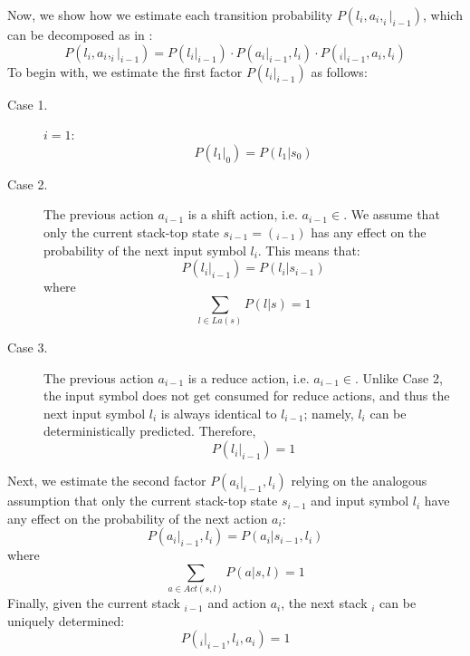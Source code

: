 \documentclass[a4j]{article}
\def\st{}
\def\top{}
\def\As{}
\def\Ar{}
\def\eq#1{}
\begin{document}
Now, we show how we estimate each transition probability
$P(l_i,a_i,\st_i|\st_{i-1})$, which can be decomposed as in \eq{St0}:
\begin{equation}
  \label{eq:St0}
  P(l_i,a_i,\st_i|\st_{i-1}) = P(l_i|\st_{i-1})\cdot
    P(a_i|\st_{i-1},l_{i})\cdot
    P(\st_i|\st_{i-1},a_{i},l_{i})
\end{equation}
To begin with, we estimate the first factor $P(l_i|\st_{i-1})$ as follows:
\begin{description}
\item[Case 1.] $i=1$:
  \begin{equation}
    \label{eq:l0}
    P(l_1|\st_0)=P(l_1|s_0)
  \end{equation}
\item[Case 2.] The previous action $a_{i-1}$ is a shift action,
  i.e. $a_{i-1}\in\As$. We assume that only the current stack-top
  state $s_{i-1}=\top(\st_{i-1})$ has any effect on the probability
  of the next input symbol $l_i$. This means that:
  \begin{equation}
    \label{eq:l1}
    P(l_i|\st_{i-1}) = P(l_i|s_{i-1})
  \end{equation}
  where
  \begin{equation}
    \sum_{l\in La(s)}P(l|s)=1
  \end{equation}
\item[Case 3.] The previous action $a_{i-1}$ is a reduce action,
  i.e. $a_{i-1}\in\Ar$. Unlike Case 2, the input symbol does not get
  consumed for reduce actions, and thus the next input symbol $l_i$ is
  always identical to $l_{i-1}$; namely, $l_i$ can be deterministically
  predicted. Therefore,
  \begin{equation}
    \label{eq:l2}
    P(l_i|\st_{i-1}) = 1
  \end{equation}
\end{description}
Next, we estimate the second factor $P(a_i|\st_{i-1},l_{i})$ relying on
the analogous assumption that only the current stack-top state
$s_{i-1}$ and input symbol $l_i$ have any effect on the
probability of the next action $a_i$:
\begin{equation}
  \label{eq:a1}
  P(a_i|\st_{i-1},l_{i}) = P(a_i|s_{i-1},l_i)
\end{equation}
where
\begin{equation}
  \sum_{a\in Act(s,l)}P(a|s,l)=1
\end{equation}
Finally, given the current stack $\st_{i-1}$ and action $a_{i}$, the
next stack $\st_i$ can be uniquely determined:
\begin{equation}
  \label{eq:st0}
  P(\st_i|\st_{i-1},l_i,a_i) = 1
\end{equation}
\end{document}
